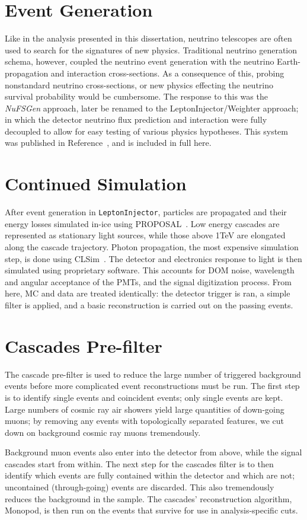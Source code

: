 \documentclass[main.tex]{subfiles}
\begin{document}
\section{Event Generation}

Like in the analysis presented in this dissertation, neutrino telescopes are often used to search for the signatures of new physics. 
Traditional neutrino generation schema, however, coupled the neutrino event generation with the neutrino Earth-propagation and interaction cross-sections.
As a consequence of this, probing nonstandard neutrino cross-sections, or new physics effecting the neutrino survival probability would be cumbersome. 
The response to this was the \textit{NuFSGen} approach, later be renamed to the LeptonInjector/Weighter approach; in which the detector neutrino flux prediction and interaction were fully decoupled to allow for easy testing of various physics hypotheses. 
This system was published in Reference~\cite{ABBASI2021108018}, and is included in full here.

\section{Continued Simulation}

After event generation in \texttt{LeptonInjector}, particles are propagated and their energy losses simulated in-ice using PROPOSAL~\cite{Koehne:2013gpa}.
Low energy cascades are represented as stationary light sources, while those above 1TeV are elongated along the cascade trajectory. 
Photon propagation, the most expensive simulation step, is done using CLSim~\cite{CLSim}. 
The detector and electronics response to light is then simulated using proprietary software. 
This accounts for DOM noise, wavelength and angular acceptance of the PMTs, and the signal digitization process.
From here, MC and data are treated identically: the detector trigger is ran, a simple filter is applied, and a basic reconstruction is carried out on the passing events. 

\section{Cascades Pre-filter}\label{sec:level3}

The cascade pre-filter is used to reduce the large number of triggered background events before more complicated event reconstructions must be run. 
The first step is to identify single events and coincident events; only single events are kept. 
Large numbers of cosmic ray air showers yield large quantities of down-going muons; by removing any events with topologically separated features, we cut down on background cosmic ray muons tremendously. 

Background muon events also enter into the detector from above, while the signal cascades start from within.
The next step for the cascades filter is to then identify which events are fully contained within the detector and which are not; uncontained (through-going) events are discarded. 
This also tremendously reduces the background in the sample. 
The cascades' reconstruction algorithm, Monopod, is then run on the events that survive for use in analysis-specific cuts.


\end{document}
